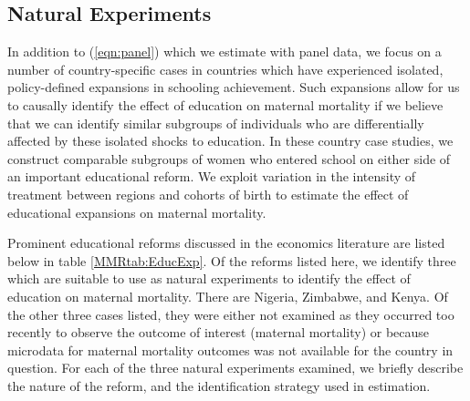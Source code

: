 \documentclass{article}[12pt,subeqn]
\begin{document}
\begin{spacing}{1.4}
\subsection{Natural Experiments}
\label{scn:empiricalexperiment}
In addition to (\ref{eqn:panel}) which we estimate with panel data, we focus on a number of country-specific 
cases in countries which have experienced isolated, policy-defined expansions in schooling achievement. Such 
expansions allow for us to causally identify the effect of education on maternal mortality if we believe that 
we can identify similar subgroups of individuals who are differentially affected by these isolated shocks to 
education. In these country case studies, we construct comparable subgroups of women who entered school on 
either side of an important educational reform.  We exploit variation in the intensity of treatment between 
regions and cohorts of birth to estimate the effect of educational expansions on maternal mortality.

Prominent educational reforms discussed in the economics literature are listed below in table \ref{MMRtab:EducExp}.  
Of the reforms listed here, we identify three which are suitable to use as natural experiments to identify
the effect of education on maternal mortality.  There are Nigeria, Zimbabwe, and Kenya.  Of the other three
cases listed, they were either not examined as they occurred too recently to observe the outcome of interest 
(maternal mortality) or because microdata for maternal mortality outcomes was not available for the country 
in question.  For each of the three natural experiments examined, we briefly describe the nature of the reform, 
and the identification strategy used in estimation.


\end{spacing}
\end{document}
